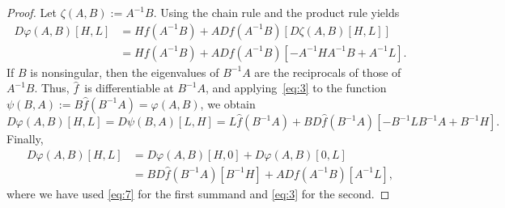\documentclass[10pt,a4paper]{amsart}
\newcommand{\Df}[3]{D#1(#2)[#3]}
\newcommand{\deq}{\ensuremath{:=}}
\newcommand{\wh}{\widehat}
\begin{document}
\begin{proof} Let $\zeta(A,B)\deq{}A^{-1}B$. Using the chain rule and the product rule yields
\begin{equation}\label{eq:3}
\begin{split}
    \Df{\varphi}{A,B}{H,L}
    & =
    Hf(A^{-1}B)+A\Df{f}{A^{-1}B}{\Df{\zeta}{A,B}{H,L}}\\
    & =
    Hf(A^{-1}B)+A\Df{f}{A^{-1}B}{-A^{-1}HA^{-1}B+A^{-1}L}.
\end{split}
\end{equation}
If $B$ is nonsingular, then the eigenvalues of $B^{-1}A$ are the reciprocals of those of $A^{-1}B$. Thus, $\widehat f$~is differentiable at $B^{-1}A$, and applying~\eqref{eq:3} to the function $\psi(B,A) \deq{} B\wh f(B^{-1}A)=\varphi(A,B)$,
we obtain
\begin{equation}\label{eq:7}
    \Df{\varphi}{A,B}{H,L} = \Df{\psi}{B,A}{L,H} = L\widehat f(B^{-1}A)+
    B\Df{\widehat f}{B^{-1}A}{-B^{-1}LB^{-1}A+B^{-1}H}.
\end{equation}
Finally,
\[
  \begin{aligned}
    \Df{\varphi}{A,B}{H,L}
    &= \Df{\varphi}{A,B}{H,0}+\Df{\varphi}{A,B}{0,L}\\
    &= B\Df{\widehat f}{B^{-1}A}{B^{-1}H} + A\Df{f}{A^{-1}B}{A^{-1}L},
  \end{aligned}
\]
where we have used \eqref{eq:7} for the first summand and \eqref{eq:3} for the second.
\end{proof}
\end{document}
